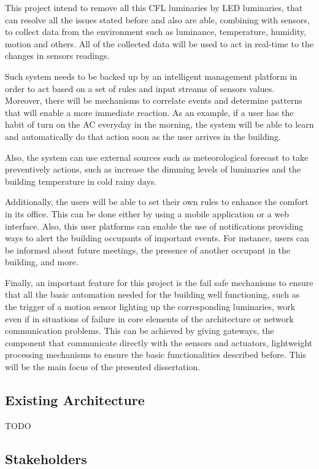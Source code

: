 This project intend to remove all this CFL luminaries by LED luminaries, that can resolve all the issues stated before and also are able, combining with sensors, to collect data from the environment such as luminance, temperature, humidity, motion and others. All of the collected data will be used to act in real-time to the changes in sensors readings. 

Such system needs to be backed up by an intelligent management platform in order to act based on a set of rules and input streams of sensors values. Moreover, there will be mechanisms to correlate events and determine patterns that will enable a more immediate reaction. As an example, if a user has the habit of turn on the AC everyday in the morning, the system will be able to learn and automatically do that action soon as the user arrives in the building. 

Also, the system can use external sources such as meteorological forecast to take preventively actions, such as increase the dimming levels of luminaries and the building temperature in cold rainy days.

Additionally, the users will be able to set their own rules to enhance the comfort in its office. This can be done either by using a mobile application or a web interface. Also, this user platforms can enable the use of notifications providing ways to alert the building occupants of important events. For instance, users can be informed about future meetings, the presence of another occupant in the building, and more.

Finally, an important feature for this project is the fail safe mechanisms to ensure that all the basic automation needed for the building well functioning, such as the trigger of a motion sensor lighting up the corresponding luminaries, work even if in situations of failure in core elements of the architecture or network communication problems. This can be achieved by giving gateways, the component that communicate directly with the sensors and actuators, lightweight processing mechanisms to ensure the basic functionalities described before. This will be the main focus of the presented dissertation.

\subsection{Existing Architecture}

TODO

\subsection{Stakeholders}
\label{Architecture:Stakeholders}

